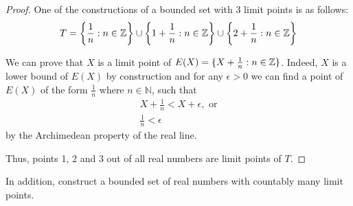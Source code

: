 \documentclass{article}
\newcommand{\N}{\mathbb{N}}
\newcommand{\Z}{\mathbb{Z}}
\DeclarePairedDelimiter{\set}{ \{ }{ \} }
\begin{document}
\begin{proof}

One of the constructions of a bounded set with 3 limit points is as follows:
\[ T = \set*{ \frac{1}{n} : n \in \Z } \cup \set*{ 1+\frac{1}{n} : n \in \Z } \cup \set*{ 2+\frac{1}{n} : n \in \Z } \] 

We can prove that $X$ is a limit point of $E(X) = \set{ X + \frac{1}{n} : n \in \Z }$.
Indeed, $X$ is a lower bound of $E(X)$ by construction and for any $\epsilon > 0$ we can find a point of $E(X)$ of the form $\frac{1}{n}$ where $n \in \N$, such that
\begin{gather*}
    X + \frac{1}{n} < X + \epsilon, \text{ or} \\
    \frac{1}{n} < \epsilon    
\end{gather*}
by the Archimedean property of the real line.

Thus, points 1, 2 and 3 out of all real numbers are limit points of $T$.

\end{proof}

\begin{tcolorbox}
In addition, construct a bounded set of real numbers with countably many limit points.
\end{tcolorbox}
\end{document}
